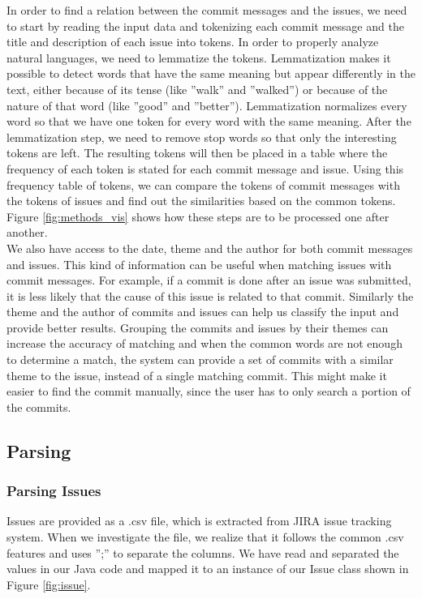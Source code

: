 In order to find a relation between the commit messages and the issues, we need to start by reading the input data and tokenizing each commit message and the title and description of each issue into tokens.
In order to properly analyze natural languages, we need to lemmatize the tokens.
Lemmatization makes it possible to detect words that have the same meaning but appear differently in the text, either because of its tense (like ''walk'' and ''walked'') or because of the nature of that word (like ''good'' and ''better'').
Lemmatization normalizes every word so that we have one token for every word with the same meaning.
After the lemmatization step, we need to remove stop words so that only the interesting tokens are left.
The resulting tokens will then be placed in a table where the frequency of each token is stated for each commit message and issue.
Using this frequency table of tokens, we can compare the tokens of commit messages with the tokens of issues and find out the similarities based on the common tokens.
Figure \ref{fig:methods_vis} shows how these steps are to be processed one after another.\\


We also have access to the date, theme and the author for both commit messages and issues.
This kind of information can be useful when matching issues with commit messages.
For example, if a commit is done after an issue was submitted, it is less likely that the cause of this issue is related to that commit.
Similarly the theme and the author of commits and issues can help us classify the input and provide better results.
Grouping the commits and issues by their themes can increase the accuracy of matching and when the common words are not enough to determine a match, the system can provide a set of commits with a similar theme to the issue, instead of a single matching commit.
This might make it easier to find the commit manually, since the user has to only search a portion of the commits.

\subsection{Parsing}

\subsubsection{Parsing Issues}
Issues are provided as a .csv file, which is extracted from JIRA issue tracking system.
When we investigate the file, we realize that it follows the common .csv features and uses '';'' to separate the columns.
We have read and separated the values in our Java code and mapped it to an instance of our Issue class shown in Figure \ref{fig:issue}. \\

